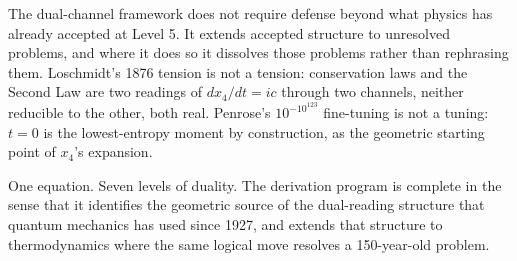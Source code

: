 \documentclass[11pt,a4paper]{article}
\begin{document}
The dual-channel framework does not require defense beyond what physics has already accepted at Level 5. It extends accepted structure to unresolved problems, and where it does so it dissolves those problems rather than rephrasing them. Loschmidt's 1876 tension is not a tension: conservation laws and the Second Law are two readings of $dx_4/dt = ic$ through two channels, neither reducible to the other, both real. Penrose's $10^{-10^{123}}$ fine-tuning is not a tuning: $t = 0$ is the lowest-entropy moment by construction, as the geometric starting point of $x_4$'s expansion.

One equation. Seven levels of duality. The derivation program is complete in the sense that it identifies the geometric source of the dual-reading structure that quantum mechanics has used since 1927, and extends that structure to thermodynamics where the same logical move resolves a 150-year-old problem.
\end{document}

